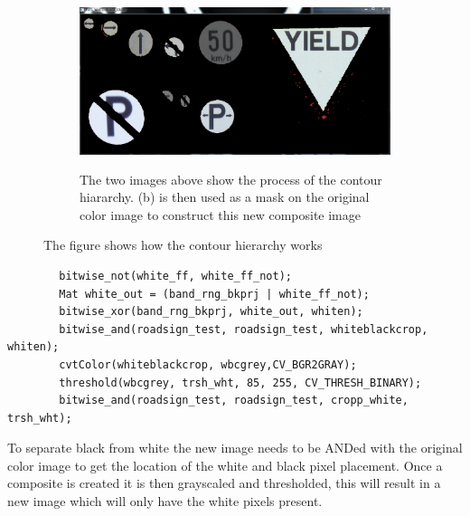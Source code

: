 \documentclass{article}
\begin{document}
\begin{figure}[H]
\center
\begin{subfigure}{0.5\textwidth}
\includegraphics[width=0.9\linewidth, height=5cm]{N_BLACK+WHITE_CROP.PNG} 
\caption{The two images above show the process of the contour hiararchy. (b) is then used as a mask on the original color image to construct this new composite image}
\label{fig:subim1}
\end{subfigure}
\caption{The figure shows how the contour hierarchy works}
\label{fig:image2}
\end{figure}



\begin{lstlisting}
		bitwise_not(white_ff, white_ff_not);
		Mat white_out = (band_rng_bkprj | white_ff_not);
		bitwise_xor(band_rng_bkprj, white_out, whiten);
		bitwise_and(roadsign_test, roadsign_test, whiteblackcrop, whiten);
		cvtColor(whiteblackcrop, wbcgrey,CV_BGR2GRAY);
		threshold(wbcgrey, trsh_wht, 85, 255, CV_THRESH_BINARY);
		bitwise_and(roadsign_test, roadsign_test, cropp_white, trsh_wht);
\end{lstlisting}
To separate black from white the new image needs to be ANDed with the original color image to get the location of the white and black pixel placement. Once a composite is created it is then grayscaled and thresholded, this will result in a new image which will only have the white pixels present. 
\end{document}
